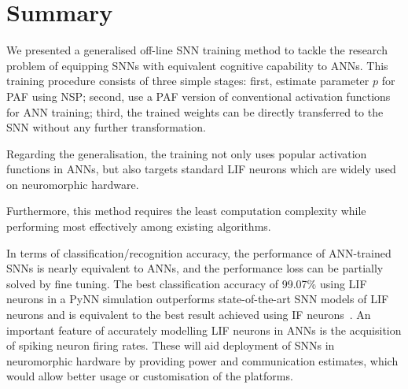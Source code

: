 \section{Summary}
	We presented a generalised off-line SNN training method to tackle the research problem of equipping SNNs with equivalent cognitive capability to ANNs.
	This training procedure consists of three simple stages: first, estimate parameter $p$ for PAF using NSP; second, use a PAF version of conventional activation functions for ANN training; %
	third, the trained weights can be directly transferred to the SNN without any further transformation.
	\DIFaddbegin {}

	
	\DIFaddend Regarding the generalisation, the training not only uses popular activation functions in ANNs, \DIFaddbegin {}\DIFaddend but also targets standard LIF neurons which are widely used on neuromorphic hardware.
	\DIFaddbegin {}

	\DIFaddend Furthermore, this method requires the least computation complexity while performing most effectively among existing algorithms.
	\DIFdelbegin %

\DIFdelend In terms of classification/recognition accuracy, the performance of ANN-trained SNNs is nearly equivalent to ANNs, and the performance loss can be partially solved by fine tuning.
	The best classification accuracy of 99.07\% using LIF neurons in a PyNN simulation outperforms state-of-the-art SNN models of LIF neurons and is equivalent to the best result achieved using IF neurons~\citep{diehl2015fast}.
An important feature of accurately modelling LIF neurons in ANNs is the acquisition of spiking neuron firing rates. These will aid deployment of SNNs in neuromorphic hardware by providing power and communication estimates, which would allow better usage or customisation of the platforms.